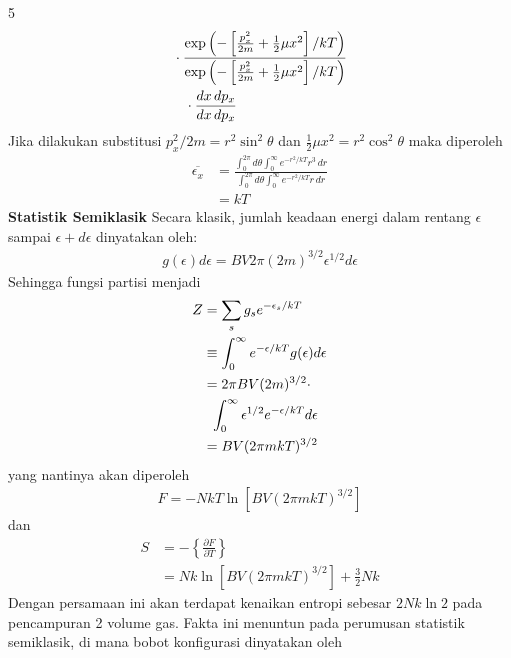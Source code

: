 \documentclass[a4paper  , 6 pt]{article}
\begin{document}
\begin{tiny}
\begin{multicols} {5}
\begin{align}
& \cdot \frac{ \exp \left( - \left[  \frac{p_x^2  }{2m} + \frac{1}{2} \mu x^2 \right ] /kT \right) }{ \exp \left( - \left[  \frac{p_x^2  }{2m} + \frac{1}{2} \mu x^2 \right ] /kT \right) } \nonumber \\
& \hspace{0.3 cm }\cdot \frac{ dx \, dp_x}{dx \, dp_x}
\end{align}
Jika dilakukan substitusi $p_x^2 /2m  = r^2 \sin^2 \theta $ dan $\frac{1}{2} \mu x^2 = r^2 \cos^2 \theta $ maka diperoleh
\begin{align}
\overline{\epsilon_x} &= \frac{\int_{0}^{2 \pi } d\theta \int_{0}^{\infty} e^{-r^2 /kT} r^3 \, dr }{\int_{0}^{2 \pi} d \theta \int_{0}^{\infty} e^{- r^2 /kT} r \, dr }
\nonumber \\
& = kT \nonumber
\end{align} \newline
\textbf{Statistik Semiklasik} \newline
Secara klasik, jumlah keadaan energi dalam rentang $\epsilon $ sampai $\epsilon + d \epsilon $ dinyatakan oleh:
\begin{align}
g(\epsilon ) d\epsilon = BV 2\pi (2m )^{3/2 }\epsilon^{1/2} d\epsilon  
\end{align}
Sehingga fungsi partisi menjadi
\begin{align}
Z& = \sum_s g_s e^{-\epsilon_s /kT} \nonumber \\&  \equiv \int_{0}^{\infty} e^{-\epsilon/kT } g(\epsilon ) d \epsilon \nonumber  \\
& = 2\pi BV (2m)^{3/2 } \cdot \nonumber \\
& \hspace{0.2 cm } \int_{0}^{\infty} \epsilon^{1/2} e^{-\epsilon /kT} d \epsilon  \nonumber \\ & = BV (2 \pi mkT)^{3/2 } 
\end{align}
yang nantinya akan diperoleh
\begin{align}
F = - Nk T \ln [BV (2 \pi mkT)^{3/2}]  
\end{align} 
dan 
\begin{align}
S &= - \left \lbrace  \frac{\partial F}{\partial T}\right \rbrace  \nonumber  \\
& =\boxed{ Nk \ln [BV (2 \pi mkT )^{3/2 }]+  \frac{3}{2} Nk  }
\end{align}
Dengan persamaan ini akan terdapat kenaikan entropi sebesar $2 Nk \ln 2$ pada pencampuran 2 volume gas.
Fakta ini menuntun pada perumusan statistik semiklasik, di mana bobot konfigurasi dinyatakan oleh 
\begin{align}

\end{align}
\end{multicols}
\end{tiny}
\end{document}

